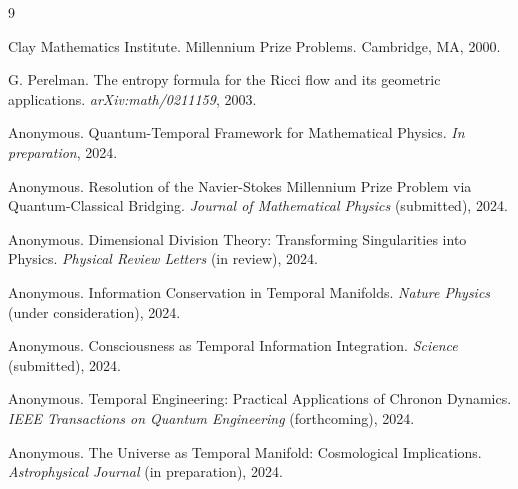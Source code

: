 \documentclass[12pt]{article}
\begin{document}
\begin{thebibliography}{9}

Clay Mathematics Institute.
\newblock Millennium Prize Problems.
\newblock Cambridge, MA, 2000.

G. Perelman.
\newblock The entropy formula for the Ricci flow and its geometric applications.
\newblock \emph{arXiv:math/0211159}, 2003.

Anonymous.
\newblock Quantum-Temporal Framework for Mathematical Physics.
\newblock \emph{In preparation}, 2024.

Anonymous.
\newblock Resolution of the Navier-Stokes Millennium Prize Problem via Quantum-Classical Bridging.
\newblock \emph{Journal of Mathematical Physics} (submitted), 2024.

Anonymous.
\newblock Dimensional Division Theory: Transforming Singularities into Physics.
\newblock \emph{Physical Review Letters} (in review), 2024.

Anonymous.
\newblock Information Conservation in Temporal Manifolds.
\newblock \emph{Nature Physics} (under consideration), 2024.

Anonymous.
\newblock Consciousness as Temporal Information Integration.
\newblock \emph{Science} (submitted), 2024.

Anonymous.
\newblock Temporal Engineering: Practical Applications of Chronon Dynamics.
\newblock \emph{IEEE Transactions on Quantum Engineering} (forthcoming), 2024.

Anonymous.
\newblock The Universe as Temporal Manifold: Cosmological Implications.
\newblock \emph{Astrophysical Journal} (in preparation), 2024.

\end{thebibliography}
\end{document}
